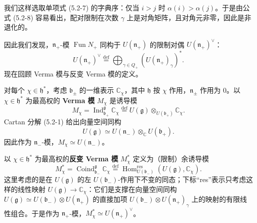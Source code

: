 我们这样选取单项式 (5.2-7) 的字典序：仅当 $i>j$ 时 $\alpha(i)>\alpha(j)$。于是由公式 (5.2-8) 容易看出，配对限制在次数 $\gamma$ 上是对角矩阵，且对角元非零，因此是非退化的。


因此我们发现，$\mathfrak{n}_+$-模 $\operatorname{Fun}N_+$ 同构于 $U(\mathfrak{n}_+)$ 的限制对偶 $U(\mathfrak{n}_+)^\vee$：
\[
    U(\mathfrak{n}_+)^\vee\overset{\text{def}}{=}\bigoplus_{\gamma\in Q_+}(U(\mathfrak{n}_+)_\gamma)^*.
\]
现在回顾 Verma 模与反变 Verma 模的定义。

对每个 $\chi\in\mathfrak{h}^*$，考虑 $\mathfrak{b}_\pm$ 的一维表示 $\mathbb{C}_\chi$，其中 $\mathfrak{h}$ 按 $\chi$ 作用，$\mathfrak{n}_\pm$ 作用为 $0$。以 $\chi\in\mathfrak{h}^*$ 为最高权的 \textbf{Verma 模} $M_\chi$ 是诱导模
\[
    M_\chi=\operatorname{Ind}_{\mathfrak{b}_+}^{\mathfrak{g}}\mathbb{C}_\chi
    \overset{\text{def}}{=}U(\mathfrak{g})\otimes_{U(\mathfrak{b}_+)}\mathbb{C}_\chi.
\]
Cartan 分解 (5.2-1) 给出向量空间同构
\[
    U(\mathfrak{g})\simeq U(\mathfrak{n}_-)\otimes_{\mathbb{C}}U(\mathfrak{b}_+).
\]
因此作为 $\mathfrak{n}_-$-模，$M_\chi\simeq U(\mathfrak{n}_-)$。

以 $\chi\in\mathfrak{h}^*$ 为最高权的\textbf{反变 Verma 模} $M_\chi^*$ 定义为（限制）余诱导模
\begin{equation}
    M_\chi^*=\operatorname{Coind}_{\mathfrak{b}_-}^{\mathfrak{g}}\mathbb{C}_\chi
    \overset{\text{def}}{=}\operatorname{Hom}^{\text{res}}_{U(\mathfrak{b}_-)}(U(\mathfrak{g}),\mathbb{C}_\chi).
    \tag{5.2-9}
\end{equation}
这里考虑的是在 $U(\mathfrak{g})$ 的左 $U(\mathfrak{b}_-)$-作用下不变的同态；下标“res”表示只考虑这样的线性映射 $U(\mathfrak{g})\to\mathbb{C}_\chi$：它们是支撑在向量空间同构 $U(\mathfrak{g})\simeq U(\mathfrak{b}_-)\otimes U(\mathfrak{n}_+)$ 的直接加项 $U(\mathfrak{b}_-)\otimes U(\mathfrak{n}_+)_\gamma$ 上的映射的有限线性组合。于是作为 $\mathfrak{n}_+$-模，$M_\chi^*\simeq U(\mathfrak{n}_+)^\vee$。


